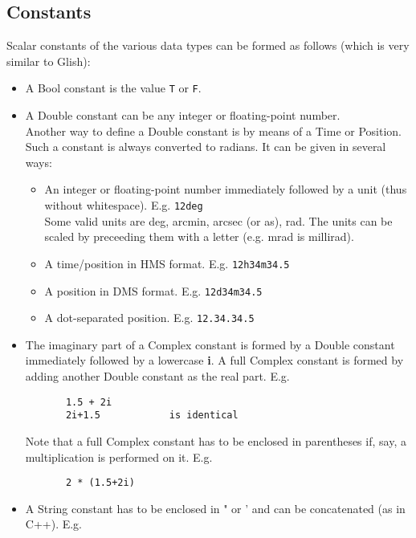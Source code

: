 \subsection{\label{TAQL:CONSTANTS}Constants}
Scalar constants of the various data types can be formed as follows
(which is very similar to Glish):
\begin{itemize}
  \item A Bool constant is the value \texttt{T} or \texttt{F}.
  \item A Double constant can be any integer or floating-point number.
       \\Another way to define a Double constant is by means of
       a Time or Position. Such a constant is always converted to radians.
       It can be given in several ways:
       \begin{itemize}
         \item An integer or floating-point number immediately
              followed by a unit
              (thus without whitespace). E.g. \texttt{12deg}
              \\Some valid units are deg, arcmin, arcsec (or as), rad.
              The units can be scaled by preceeding them with a letter
              (e.g. mrad is millirad).
         \item A time/position in HMS format.
              E.g. \texttt{12h34m34.5}
         \item A position in DMS format.
              E.g. \texttt{12d34m34.5}
         \item A dot-separated position.
              E.g. \texttt{12.34.34.5}
       \end{itemize}
  \item The imaginary part of a Complex constant is formed by a Double
       constant immediately followed by a lowercase \textbf{i}. A full Complex
       constant is formed by adding another Double constant as the
       real part. E.g.
       \begin{verbatim}
       1.5 + 2i
       2i+1.5            is identical
       \end{verbatim}
       Note that a full Complex constant has to be enclosed
       in parentheses if, say, a multiplication is performed on it. E.g.
       \begin{verbatim}
       2 * (1.5+2i)
       \end{verbatim}
  \item A String constant has to be enclosed in " or ' and can be
       concatenated (as in C++). E.g.
       \begin{verbatim}

\end{verbatim}
\end{itemize}
